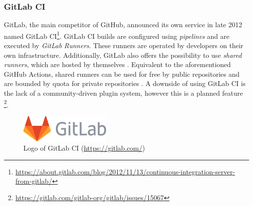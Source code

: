 
\subsubsection{GitLab CI}
GitLab, the main competitor of GitHub, announced its own \CI{} service in late 2012 named GitLab CI\footnote{\url{https://about.gitlab.com/blog/2012/11/13/continuous-integration-server-from-gitlab/}}. GitLab CI builds are configured using \emph{pipelines} and are executed by \emph{GitLab Runners}. These runners are operated by developers on their own infrastructure. Additionally, GitLab also offers the possibility to use \emph{shared runners}, which are hosted by themselves \cite{ciusinggitlab}. Equivalent to the aforementioned GitHub Actions, shared runners can be used for free by public repositories and are bounded by quota for private repositories \cite{gitlabdocs}. A downside of using GitLab CI is the lack of a community-driven plugin system, however this is a planned feature \footnote{\url{https://gitlab.com/gitlab-org/gitlab/issues/15067}}.

\begin{figure}[htbp!]
	\centering
	\includegraphics[width=0.40\textwidth]{assets/gitlab.pdf}
	\caption{Logo of GitLab CI (\url{https://gitlab.com/})}
	\label{fig:gitlab-ci}
\end{figure}